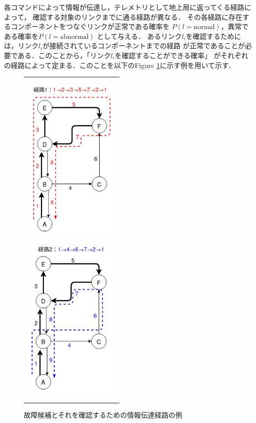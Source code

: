\documentclass[11pt]{article}
\begin{document}
各コマンドによって情報が伝達し，テレメトリとして地上局に返ってくる経路によって，
確認する対象のリンクまでに通る経路が異なる．%
その各経路に存在するコンポーネントをつなぐリンクが正常である確率を
$P(l = \text{normal})$，異常である確率を$P(l = \text{abnormal})$ %
として与える．
あるリンク$l_i$を確認するためには，リンク$l_i$が接続されているコンポーネントまでの経路
が正常であることが必要である．このことから，「リンク$l_i$を確認することができる確率」
がそれぞれの経路によって定まる．このことを以下のFigure \ref{fig:route}に示す例を用いて示す．\\
\begin{figure}[H]
   \centering
      \begin{tabular}{c}
         \begin{minipage}{0.50\hsize}
         \centering
         \includegraphics[height=8cm]{figure/route1.png}
            \label{fig:route1}
         \end{minipage}
         \begin{minipage}{0.50\hsize}
         \centering
         \includegraphics[height=8cm]{figure/route2.png}
            \label{fig:route2}
         \end{minipage}
      \end{tabular} 
      \caption{故障候補とそれを確認するための情報伝達経路の例}
      \label{fig:route}
\end{figure}
\end{document}
